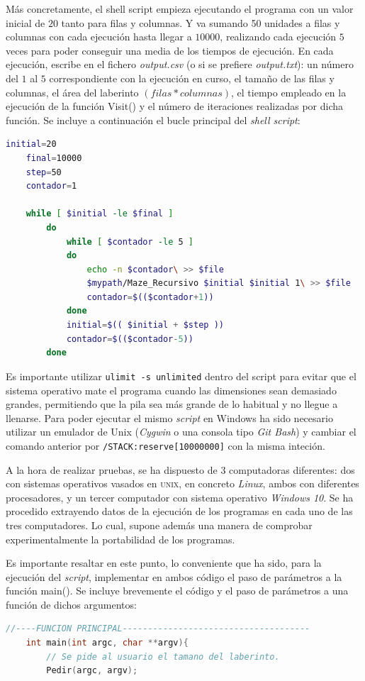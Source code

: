 \documentclass[12pt,a4paper]{article}
\begin{document}
\vspace{0.2cm}
Más concretamente, el shell script empieza ejecutando el programa con un valor inicial de $20$ tanto para filas y columnas. Y va sumando 50 unidades a filas y columnas con cada ejecución hasta llegar a $10000$, realizando cada ejecución $5$ veces para poder conseguir una media de los tiempos de ejecución. En cada ejecución, escribe en el fichero \textit{output.csv} (o si se prefiere \textit{output.txt}): un número del $1$ al $5$ correspondiente con la ejecución en curso, el tamaño de las filas y columnas, el área del laberinto $(filas*columnas)$, el tiempo empleado en la ejecución de la función \textsf{Visit()} y el número de iteraciones realizadas por dicha función. Se incluye a continuación el bucle principal del \textit{shell script}:

\lstset{style=mystyle}
\begin{lstlisting}[language=sh, title= Fragmento principal del shell script, frame=single, numbers=none]
	initial=20
	final=10000
	step=50
	contador=1
	
	while [ $initial -le $final ]
		do 
			while [ $contador -le 5 ]
			do
				echo -n $contador\ >> $file
				$mypath/Maze_Recursivo $initial $initial 1\ >> $file
				contador=$(($contador+1))
			done
			initial=$(( $initial + $step ))
			contador=$(($contador-5))
		done
\end{lstlisting}
Es importante utilizar \verb|ulimit -s unlimited| dentro del script para evitar que el sistema operativo mate el programa cuando las dimensiones sean demasiado grandes, permitiendo que la pila sea más grande de lo habitual y no llegue a llenarse. Para poder ejecutar el mismo \textit{script} en Windows ha sido necesario utilizar un emulador de Unix (\textit{Cygwin} o una consola tipo \textit{Git Bash}) y cambiar el comando anterior por \verb|/STACK:reserve[10000000]| con la misma inteción.

\vspace{0.2cm}
A la hora de realizar pruebas, se ha dispuesto de 3 computadoras diferentes: dos  con sistemas operativos vasados en \textsc{unix}, en concreto \textit{Linux}, ambos con diferentes procesadores, y un tercer computador con sistema operativo \textit{Windows 10}. Se ha procedido extrayendo datos de la ejecución de los programas en cada uno de las tres computadores. Lo cual, supone además una manera de comprobar experimentalmente la portabilidad de los programas.

\vspace{0.2cm}
Es importante resaltar en este punto, lo conveniente que ha sido, para la ejecución del \textit{script}, implementar en ambos código el paso de parámetros a la función \textsf{main()}. Se incluye brevemente el código y el paso de parámetros a una función de dichos argumentos:
\lstset{style=mystyle}
\begin{lstlisting}[language=C++, title= Implementación de paso de argumentos al \textsf{main()}, frame=single, numbers=none]
	//----FUNCION PRINCIPAL-------------------------------------
	int main(int argc, char **argv){
		// Se pide al usuario el tamano del laberinto.
  		Pedir(argc, argv);
\end{lstlisting}
\end{document}
